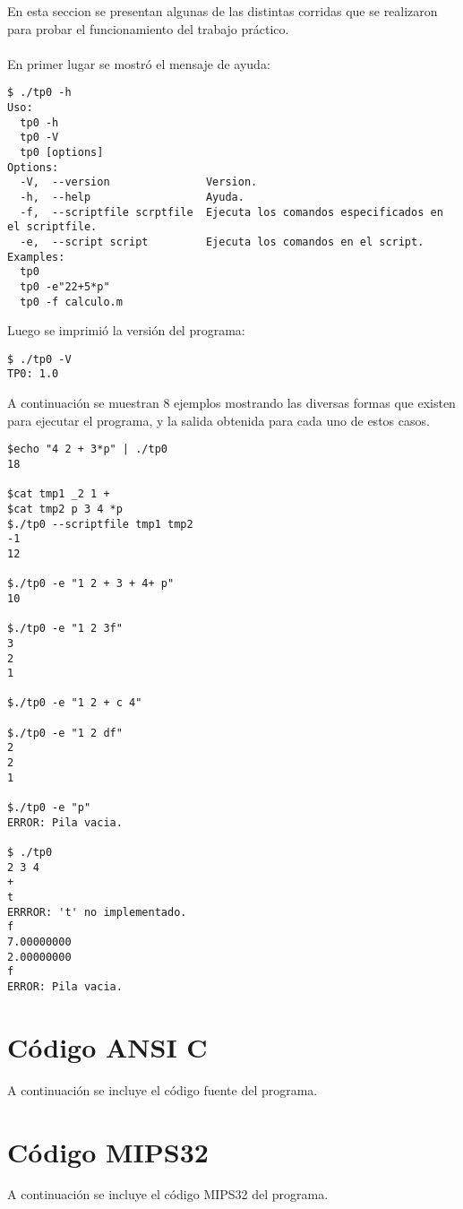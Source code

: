\documentclass[a4paper,10pt]{article}
\begin{document}
En esta seccion se presentan algunas de las distintas corridas que se realizaron para probar el funcionamiento del trabajo pr\'actico.\\
\\
En primer lugar se mostr\'o el mensaje de ayuda:\\
\begin{verbatim}
$ ./tp0 -h
Uso:
  tp0 -h
  tp0 -V
  tp0 [options]
Options:
  -V,  --version               Version.
  -h,  --help                  Ayuda.
  -f,  --scriptfile scrptfile  Ejecuta los comandos especificados en el scriptfile.
  -e,  --script script         Ejecuta los comandos en el script.
Examples:
  tp0
  tp0 -e"22+5*p"
  tp0 -f calculo.m
\end{verbatim}
Luego se imprimi\'o la versi\'on del programa:\\
\begin{verbatim}
$ ./tp0 -V
TP0: 1.0
\end{verbatim}
A continuaci\'on se muestran 8 ejemplos mostrando las diversas formas que existen para ejecutar el programa, y la salida obtenida para cada uno de estos casos.
\begin{verbatim}
$echo "4 2 + 3*p" | ./tp0
18

$cat tmp1 _2 1 +
$cat tmp2 p 3 4 *p
$./tp0 --scriptfile tmp1 tmp2
-1
12

$./tp0 -e "1 2 + 3 + 4+ p"
10

$./tp0 -e "1 2 3f"
3
2
1

$./tp0 -e "1 2 + c 4"

$./tp0 -e "1 2 df"
2
2
1

$./tp0 -e "p"
ERROR: Pila vacia.

$ ./tp0
2 3 4
+
t
ERRROR: 't' no implementado.
f
7.00000000
2.00000000
f
ERROR: Pila vacia.

\end{verbatim}
\pagebreak

\section{C\'odigo ANSI C} 

A continuaci\'on se incluye el c\'odigo fuente del programa.
\pagebreak

\section{C\'odigo MIPS32} 

A continuaci\'on se incluye el c\'odigo MIPS32 del programa.
\end{document}
